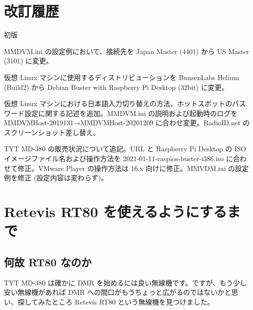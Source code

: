 \documentclass[a4j,oneside]{ujbook}
\begin{document}
\chapter{改訂履歴}
\begin{description}[style=nextline]
 \item[20190822] 初版
 \item[20200222] MMDVM.ini の設定例において、接続先を Japan Master (4401) から US Master (3101) に変更。
 \item[20200223] 仮想 Linux マシンに使用するディストリビューションを BunsenLabs Helium (Build2) から Debian Buster with Raspberry Pi Desktop (32bit) に変更。
 \item[20201213] 仮想 Linux マシンにおける日本語入力切り替えの方法、ホットスポットのパスワード設定に関する記述を追加。MMDVM.ini の説明および起動時のログを MMDVMHost-2019131→MMDVMHost-20201209 に合わせ変更。RadioID.net のスクリーンショット差し替え。
 \item[20210703] TYT MD-380 の販売状況について追記。URL と Raspberry Pi Desktop の ISO イメージファイル名および操作方法を 2021-01-11-raspios-buster-i386.iso に合わせて修正。VMware Player の操作方法は 16.x 向けに修正。MMVDM.ini の設定例を修正 (設定内容は変わらず)。
\end{description}

\appendix
\chapter{Retevis RT80 を使えるようにするまで}

\section{何故 RT80 なのか}

TYT MD-380 は確かに DMR を始めるには良い無線機です。ですが、もう少し安い無線機があれば DMR への間口がもうちょっと広がるのではないかと思い、探してみたところ Retevis RT80 という無線機を見つけました。
\end{document}
